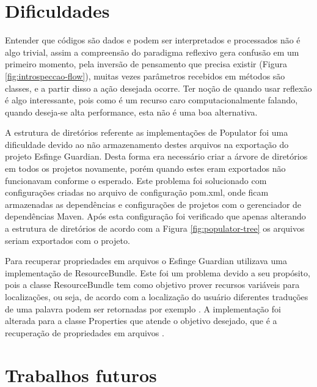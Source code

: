 \section{Dificuldades}

\par Entender que códigos são dados e podem ser interpretados e processados não é algo trivial, assim a compreensão do paradigma reflexivo gera confusão em um primeiro momento, pela inversão de pensamento que precisa existir (Figura \ref{fig:introspeccao-flow}), muitas vezes parâmetros recebidos em métodos são classes, e a partir disso a ação desejada ocorre. Ter noção de quando usar reflexão é algo interessante, pois como é um recurso caro computacionalmente falando, quando deseja-se alta performance, esta não é uma boa alternativa.

\par A estrutura de diretórios referente as implementações de Populator foi uma dificuldade devido ao não armazenamento destes arquivos na exportação do projeto Esfinge Guardian. Desta forma era necessário criar a árvore de diretórios em todos os projetos novamente, porém quando estes eram exportados não funcionavam conforme o esperado. Este problema foi solucionado com configurações criadas no arquivo de configuração pom.xml, onde ficam armazenadas as dependências e configurações de projetos com o gerenciador de dependências Maven. Após esta configuração foi verificado que apenas alterando a estrutura de diretórios de acordo com a Figura \ref{fig:populator-tree} os arquivos seriam exportados com o projeto.

\par Para recuperar propriedades em arquivos o Esfinge Guardian utilizava uma implementação de ResourceBundle. Este foi um problema devido a seu propósito, pois a classe ResourceBundle tem como objetivo prover recursos variáveis para localizações, ou seja, de acordo com a localização do usuário diferentes traduções de uma palavra podem ser retornadas por exemplo \cite{oracleeesourcebundle}. A implementação foi alterada para a classe Properties que atende o objetivo desejado, que é a recuperação de propriedades em arquivos \cite{oracleproperties}.

\section{Trabalhos futuros}

